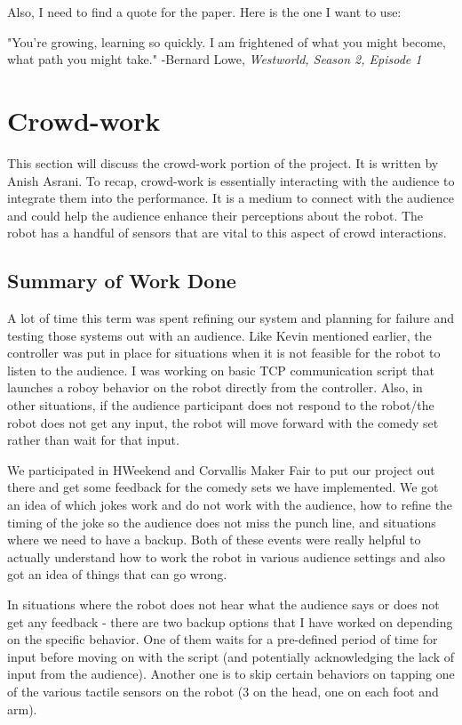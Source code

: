 \documentclass[onecolumn, draftclsnofoot,10pt, compsoc]{IEEEtran}
\begin{document}
 Also, I need to find a quote for the paper. Here is the one I want to use:


 \begin{displayquote}
	 "You're growing, learning so quickly. I am frightened of what you might become, what path you might take."
	 -Bernard Lowe, \textit{Westworld, Season 2, Episode 1}
 \end{displayquote}



\section{Crowd-work}
This section will discuss the crowd-work portion of the project. It is written by Anish Asrani. To recap, crowd-work is essentially interacting with the audience to integrate them into the performance. It is a medium to connect with the audience and could help the audience enhance their perceptions about the robot. The robot has a handful of sensors that are vital to this aspect of crowd interactions.

\subsection{Summary of Work Done}
A lot of time this term was spent refining our system and planning for failure and testing those systems out with an audience. Like Kevin mentioned earlier, the controller was put in place for situations when it is not feasible for the robot to listen to the audience. I was working on basic TCP communication script that launches a roboy behavior on the robot directly from the controller.  Also, in other situations, if the audience participant does not respond to the robot/the robot does not get any input, the robot will move forward with the comedy set rather than wait for that input.

We participated in HWeekend and Corvallis Maker Fair to put our project out there and get some feedback for the comedy sets we have implemented. We got an idea of which jokes work and do not work with the audience, how to refine the timing of the joke so the audience does not miss the punch line, and situations where we need to have a backup. Both of these events were really helpful to actually understand how to work the robot in various audience settings and also got an idea of things that can go wrong.

In situations where the robot does not hear what the audience says or does not get any feedback - there are two backup options that I have worked on depending on the specific behavior. One of them waits for a pre-defined period of time for input before moving on with the script (and potentially acknowledging the lack of input from the audience). Another one is to skip certain behaviors on tapping one of the various tactile sensors on the robot (3 on the head, one on each foot and arm).
\end{document}
